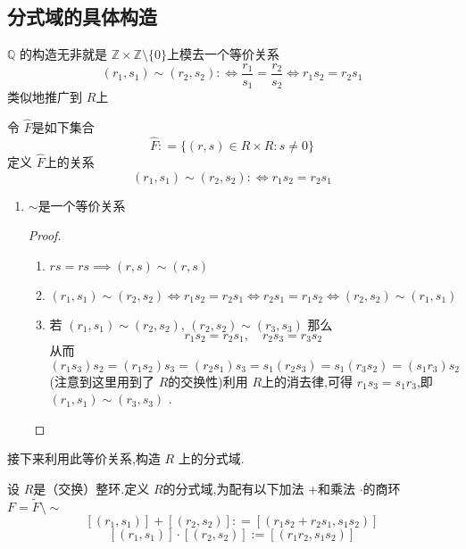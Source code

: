 \documentclass[lang=cn,12pt,color=green,fontset=none,pad]{elegantbook}
\begin{document}
\subsection{分式域的具体构造}

$ \mathbb{Q} $ 的构造无非就是 $\mathbb{Z} \times \mathbb{Z}\setminus \{ 0 \}  $上模去一个等价关系 $$\left( r_1,s_1 \right) \sim  \left( r_2,s_2 \right) : \iff    \frac{r_1}{s_1}= \frac{r_2}{s_2} \iff r_1s_2=r_2s_1 $$ 
类似地推广到 $ R $上 
\begin{definition}
令 $ \hat{F} $是如下集合 $$
\hat{F} : = \{ \left( r,s \right) \in R\times R: s \neq  0  \}
$$定义 $ \hat{F} $上的关系 $$
\left( r_1,s_1 \right)\sim \left( r_2,s_2 \right): \iff r_1s_2=r_2s_1  
$$  
\end{definition} 
\begin{remark}
    \begin{enumerate}
        \item $ \sim  $是一个等价关系 
        \begin{proof}
            \begin{enumerate}
                \item  $rs=rs\implies \left( r,s \right) \sim \left( r,s \right)  $
                \item $ \left( r_1,s_1 \right)\sim \left( r_2,s_2 \right)\iff r_1s_2=r_2s_1 \iff r_2s_1=r_1s_2\iff \left( r_2,s_2 \right)\sim \left( r_1 ,s_1\right)     $  
                \item 若 $ \left( r_1,s_1 \right)\sim \left( r_2,s_2 \right)   $, $ \left( r_2,s_2 \right)\sim \left( r_3,s_3 \right)   $  那么
                 $$
                 r_1s_2=r_2s_1,\quad r_2s_3= r_3s_2
                 $$从而 $$
                 \left( r_1s_3 \right)s_2= \left( r_1s_2 \right)s_3= \left( r_2s_1 \right)s_3=s_1\left( r_2s_3 \right)= s_1\left( r_3s_2 \right)     =\left( s_1r_3 \right)s_2 
                 $$(注意到这里用到了 $ R $的交换性)利用 $ R $上的消去律,可得 $ r_1s_3=s_1r_3 $,即 $ \left( r_1,s_1 \right)\sim \left( r_3,s_3 \right)   $   .

            \end{enumerate}        
        \end{proof} 
    \end{enumerate}
\end{remark}  



接下来利用此等价关系,构造 $ R $ 上的分式域.
\begin{definition}
    设 $ R $是（交换）整环.定义 $ R $的分式域,为配有以下加法 $ +  $和乘法 $ \cdot  $的商环 $ F = \tilde{F}\setminus \sim  $   $$
    [\left( r_1,s_1 \right) ]+ [\left( r_2,s_2 \right) ]: = [\left( r_1s_2+ r_2s_1,s_1s_2 \right) ] $$
    $$
    [\left( r_1,s_1 \right) ] \cdot [\left( r_2,s_2 \right) ] := [\left( r_1 r_2,s_1s_2 \right) ]
    $$
\end{definition} 
\end{document}
